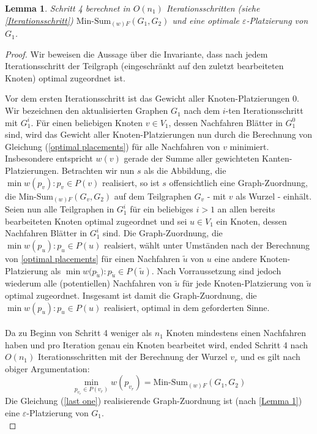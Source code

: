 \documentclass[a4paper, 12pt, twoside]{article}
\theoremstyle{Format1} %
\newtheorem{Lem}[Def]{Lemma}                %
\begin{document}
\begin{Lem} \label{Lemma 2}
	Schritt 4 berechnet in $O(n_1)$ Iterationsschritten (siehe \ref{Iterationsschritt}) $\text{Min-Sum}_{(w)F}(G_1,G_2)$ und
	eine optimale $\varepsilon$-Platzierung von $G_1$.
\end{Lem}

\begin{proof}
Wir beweisen die Aussage über die Invariante, dass nach jedem Iterationsschritt der Teilgraph (eingeschränkt auf
den zuletzt bearbeiteten Knoten) optimal zugeordnet ist.

Vor dem ersten Iterationsschritt ist das Gewicht aller Knoten-Platzierungen $0$.
Wir bezeichnen den aktualisierten Graphen $G_1$ nach dem $i$-ten Iterationsschritt mit $G_1^i$.
Für einen beliebigen Knoten $v \in V_1$, dessen Nachfahren Blätter in $G_1^0$ sind, wird das Gewicht aller Knoten-Platzierungen nun durch die Berechnung von Gleichung (\ref{optimal placements})
für alle Nachfahren von $v$ minimiert. Insbesondere entspricht $w(v)$ gerade der Summe aller gewichteten Kanten-Platzierungen. Betrachten wir nun $s$ als die Abbildung, die $\min{w(p_v)}: p_v \in P(v)$ realisiert,
so ist $s$ offensichtlich eine Graph-Zuordnung, die Min-Sum$_{(w)F}(G_v, G_2)$ auf dem Teilgraphen $G_v$ - mit $v$ als Wurzel - einhält.
\\
Seien nun alle Teilgraphen in $G_1^i$ für ein beliebiges $i>1$ an allen bereits bearbeiteten Knoten optimal zugeordnet und sei $u \in V_1$ ein Knoten, dessen
Nachfahren Blätter in $G_1^i$ sind. Die Graph-Zuordnung, die $\min{w(p_u)}: p_u \in P(u)$ realsiert, wählt unter Umständen nach der Berechnung von \ref{optimal placements}
für einen Nachfahren $\tilde{u}$ von $u$ eine andere Knoten-Platzierung als $\min{w(p_{\tilde{u}}}): p_{\tilde{u}} \in P(\tilde{u})$. Nach Vorraussetzung sind jedoch
wiederum alle (potentiellen) Nachfahren von $\tilde{u}$ für jede Knoten-Platzierung von $\tilde{u}$ optimal zugeordnet. Insgesamt ist damit die Graph-Zuordnung, die $\min{w(p_u)}: p_u \in P(u)$ realisiert,
optimal in dem geforderten Sinne.
\\
\\
Da zu Beginn von Schritt 4 weniger als $n_1$ Knoten mindestens einen Nachfahren haben und pro Iteration genau ein Knoten bearbeitet wird,
ended Schritt 4 nach $O(n_1)$ Iterationsschritten mit der Berechnung der Wurzel $v_r$ und es gilt nach obiger Argumentation:
\begin{equation}
	\min_{p_{v_r} \in P(v_r)}{w(p_{v_r})} = \text{Min-Sum}_{(w)F}(G_1,G_2) \label {last one}
\end{equation}
Die Gleichung (\ref{last one}) realisierende Graph-Zuordnung ist (nach \ref{Lemma 1}) eine $\varepsilon$-Platzierung von $G_1$.
\\
\end{proof}
\end{document}
